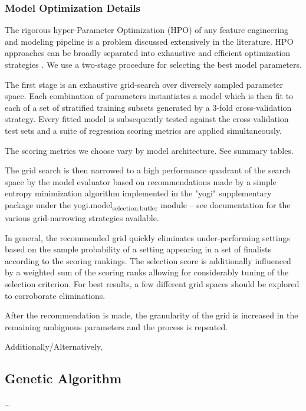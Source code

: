 \documentclass[aip, jmp, amsmath, amssymb]{revtex4-2}
\begin{document}
\subsubsection*{Model Optimization Details}
\label{sec:org217195c}
The rigorous hyper-Parameter Optimization (HPO) of any feature
engineering and modeling pipeline is a problem discussed extensively
in the literature. HPO approaches can be broadly separated into
exhaustive and efficient optimization strategies
\cite{yang-2020-hyper-optim}. We use a two-stage procedure for
selecting the best model parameters.

The first stage is an exhaustive grid-search over diversely sampled
parameter space. Each combination of parameters instantiates a model
which is then fit to each of a set of stratified training subsets
generated by a 3-fold cross-validation strategy. Every fitted model is
subsequently tested against the cross-validation test sets and a suite
of regression scoring metrics are applied simultaneously.

The scoring metrics we choose vary by model architecture. See summary tables.

The grid search is then narrowed to a high performance quadrant of the
search space by the model evaluator based on recommendations made by a
simple entropy minimization algorithm implemented in the "yogi"
supplementary package under the yogi.model\textsubscript{selection.butler} module --
see documentation for the various grid-narrowing strategies available.

In general, the recommended grid quickly eliminates under-performing
settings based on the sample probability of a setting appearing in a
set of finalists according to the scoring rankings. The selection
score is additionally influenced by a weighted sum of the scoring
ranks allowing for considerably tuning of the selection criterion.
For best results, a few different grid spaces should be explored to
corroborate eliminations.

After the recommendation is made, the granularity of the grid is
increased in the remaining ambiguous parameters and the process is
repeated.

Additionally/Alternatively,

\subsection*{Genetic Algorithm}
\label{sec:org9543749}
\ldots{}\\
\end{document}
